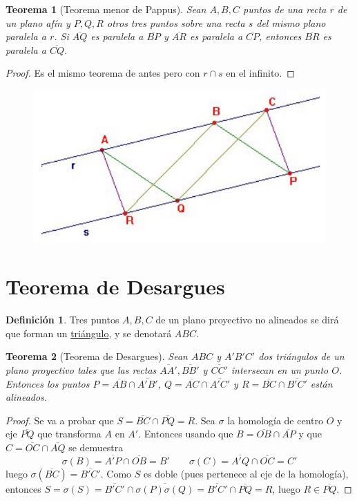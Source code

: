 \documentclass[12pt]{report}
\newtheorem{theorem}{Teorema}[chapter]
\theoremstyle{definition}
\newtheorem{definition}{Definición}[chapter]
\theoremstyle{definition}
\theoremstyle{remark}
\begin{document}
\begin{theorem}[Teorema menor de Pappus]
Sean $A,B,C$ puntos de una recta $r$ de un plano afín y $P,Q,R$ otros tres puntos sobre una recta $s$ del mismo plano paralela a $r$. Si $\overline{AQ}$ es paralela a $\overline{BP}$ y $\overline{AR}$ es paralela a $\overline{CP}$, entonces $\overline{BR}$ es paralela a $\overline{CQ}$.
\end{theorem}
\begin{proof}
Es el mismo teorema de antes pero con $r \cap s$ en el infinito.
\end{proof}

\begin{figure}[h]
\includegraphics[scale = 0.35]{3.2_3}
\centering
\end{figure}

\section{Teorema de Desargues}

\begin{definition}
Tres puntos $A,B,C$ de un plano proyectivo no alineados se dirá que forman un \ul{triángulo}, y se denotará $ABC$.
\end{definition}

\begin{theorem}[Teorema de Desargues]
Sean $ABC$ y $A'B'C'$ dos triángulos de un plano proyectivo tales que las rectas $\overline{AA'}, \overline{BB'}$ y $\overline{CC'}$ intersecan en un punto $O$. Entonces los puntos $P = \overline{AB} \cap \overline{A'B'}$, $Q = \overline{AC} \cap \overline{A'C'}$ y $R = \overline{BC} \cap \overline{B'C'}$ están alineados.
\end{theorem}

\begin{proof}
Se va a probar que $S = \overline{BC} \cap \overline{PQ} = R$. Sea $\sigma$ la homología de centro $O$ y eje $\overline{PQ}$ que transforma $A$ en $A'$. Entonces usando que $B = \overline{OB} \cap \overline{AP}$ y que $C = \overline{OC} \cap \overline{AQ}$ se demuestra
\[\sigma(B) = \overline{A'P} \cap \overline{OB} = B' \qquad \sigma(C) = \overline{A'Q} \cap \overline{OC} = C'\]
luego $\sigma(\overline{BC}) = \overline{B'C'}$. Como $S$ es doble (pues pertenece al eje de la homología), entonces $S = \sigma(S) = \overline{B'C'} \cap \overline{\sigma(P)\sigma(Q)} = \overline{B'C'} \cap \overline{PQ} = R$, luego $R \in \overline{PQ}$.
\end{proof}
\end{document}

